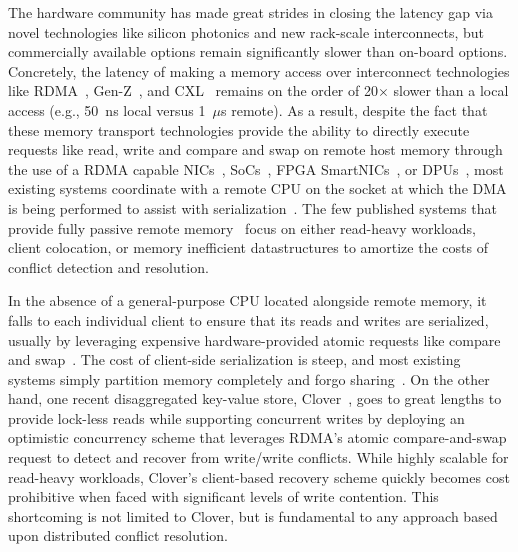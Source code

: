 The hardware community has made great strides in closing the latency gap via
novel technologies like silicon photonics and new rack-scale interconnects, but
commercially available options remain significantly slower than on-board
options.  Concretely, the latency of making a memory access over interconnect
technologies like RDMA~\cite{infiniband-spec}, Gen-Z~\cite{genz}, and
CXL~\cite{cxl} 
remains on the order of 20$\times$ slower than a local access (e.g., 50~ns local
versus 1~$\mu$s remote).  As a result, despite the fact that these memory
transport technologies provide the ability to directly execute requests like
read, write and compare and swap on remote host memory through the use of a RDMA
capable NICs~\cite{connectx}, SoCs~\cite{cavium}, FPGA
SmartNICs~\cite{corundum,kv-direct}, or DPUs~\cite{fungible}, most existing
systems coordinate with a remote CPU on the socket at which the DMA is being
performed to assist with serialization~\cite{cliquemap,erpc,herd,sonuma,storm}.
The few published systems that provide fully passive remote
memory~\cite{reigons,clover,sherman,race} focus on either read-heavy workloads,
client colocation, or memory inefficient datastructures to amortize the costs of
conflict detection and resolution.



In the absence of a general-purpose CPU located alongside remote
memory, it falls to each individual client to ensure that its reads
and writes are serialized, usually by leveraging expensive
hardware-provided atomic requests like compare and
swap~\cite{design-guidelines,clover}.  The cost of client-side
serialization is steep, and most existing systems simply partition memory
completely and forgo sharing~\cite{reigons,fastswap, legoos}.  On the
other hand, one recent disaggregated key-value store,
Clover~\cite{clover}, goes to great lengths to provide lock-less reads
while supporting concurrent writes by deploying an optimistic
concurrency scheme that leverages RDMA's atomic compare-and-swap
request to detect and recover from write/write conflicts.  While
highly scalable for read-heavy workloads, Clover's client-based
recovery scheme quickly becomes cost prohibitive when faced with
significant levels of write contention.  This shortcoming is not
limited to Clover, but is fundamental to any approach based upon
distributed conflict resolution.

